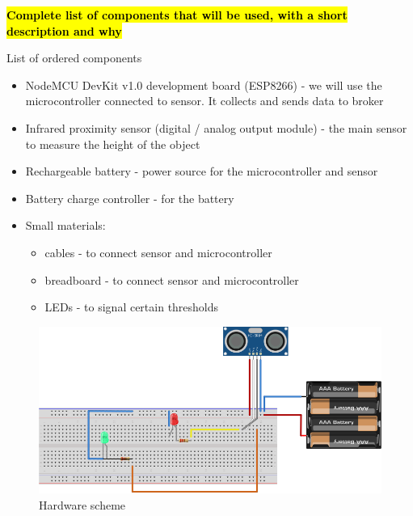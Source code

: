 \documentclass{article}
\begin{document}
\textcolor{red}{\textbf{\hl{Complete list of components that will be used, with a short description and why}}}

List of ordered components
\begin{itemize}
\item NodeMCU DevKit v1.0 development board (ESP8266) - we will use the microcontroller connected to sensor. It collects and sends data to broker
\item Infrared proximity sensor (digital / analog output module) - the main sensor to measure the height of the object
\item Rechargeable battery - power source for the microcontroller and sensor
\item Battery charge controller - for the battery
\item Small materials: 
	\begin{itemize}
		\item cables - to connect sensor and microcontroller
		\item breadboard - to connect sensor and microcontroller
		\item LEDs - to signal certain thresholds
	\end{itemize}
\end{itemize}

\begin{figure}[]
	\centering
	\includegraphics[scale=0.4]{images/schema_bb.png}
	\caption{Hardware scheme}	
	\label{schema_bb}
\end{figure}
\end{document}
